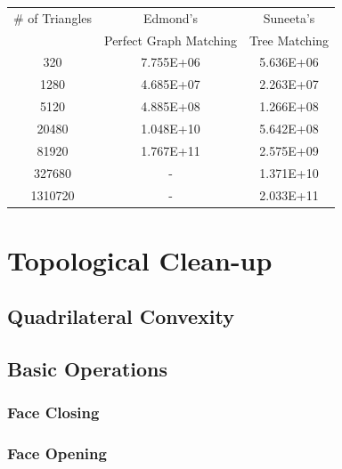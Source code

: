 \documentclass[11pt, a4paper]{paper}
\begin{document}
{\begin{table}[h]
\begin{center}
\begin{tabular}{|c|c|c|} 
\hline \# of Triangles &  Edmond's       & Suneeta's     \\
               & Perfect Graph Matching  & Tree Matching  \\ 
\hline  320    &   7.755E+06             & 5.636E+06      \\
\hline  1280   &   4.685E+07             & 2.263E+07       \\
\hline  5120   &   4.885E+08             & 1.266E+08       \\
\hline  20480  &   1.048E+10             & 5.642E+08       \\
\hline  81920  &   1.767E+11             & 2.575E+09       \\
\hline  327680 &      -                  & 1.371E+10       \\
\hline  1310720 &      -                 & 2.033E+11       \\
\hline
\end{tabular}
\end{center}
\end{table}







\section { Topological Clean-up}
\subsection{ Quadrilateral Convexity }
\subsection{ Basic Operations}
\subsubsection{ Face Closing }
\subsubsection{ Face Opening }
}
\end{document}
